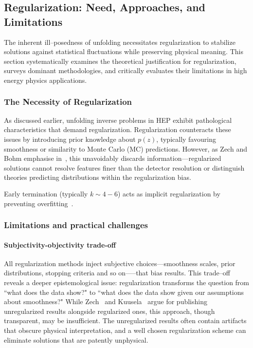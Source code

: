         \subsection{Regularization: Need, Approaches, and Limitations}  
        The inherent ill--posedness of unfolding necessitates regularization to stabilize solutions against statistical fluctuations while preserving physical meaning.
        This section systematically examines the theoretical justification for regularization, surveys dominant methodologies, and critically evaluates their limitations in high energy physics applications.
        
        \subsubsection{The Necessity of Regularization}  
         As discussed earlier, unfolding inverse problems in HEP exhibit pathological characteristics that demand regularization.
        Regularization counteracts these issues by introducing prior knowledge about \(p(z)\), typically favouring smoothness or similarity to Monte Carlo (MC) predictions.
        However, as Zech and Bohm emphasise in~\cite{Bohm2025IntroductionPhysicists}, this unavoidably discards information---regularized solutions cannot resolve features finer than the detector resolution or distinguish theories predicting distributions within the regularization bias.
        
        Early termination (typically \(k \sim 4-6\)) acts as implicit regularization by preventing overfitting~\cite{multhei_iterative_1987}.

    \subsubsection{Limitations and practical challenges}  
        \paragraph{Subjectivity-objectivity trade-off}  
            All regularization methods inject subjective choices---smoothness scales, prior distributions, stopping criteria and so on—--that bias results.
            This trade--off reveals a deeper epistemological issue: regularization transforms the question from ``what does the data show?" to ``what does the data show given our assumptions about smoothness?"
            While Zech~\cite{zech_regularization_2011} and Kuusela~\cite{kuusela_uncertainty_2016} argue for publishing unregularized results alongside regularized ones, this approach, though transparent, may be insufficient.
            The unregularized results often contain artifacts that obscure physical interpretation, and a well chosen regularization scheme can eliminate solutions that are patently unphysical.
            
